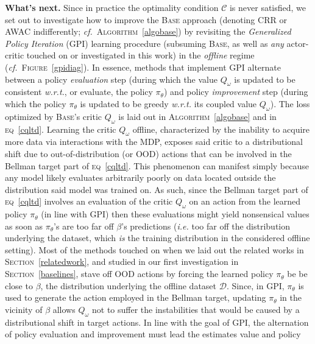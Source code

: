 \textbf{What's next.}
Since in practice the optimality condition $\mathcal{C}$ is never satisfied,
we set out to investigate how to improve the \textsc{Base} approach (denoting CRR
or AWAC indifferently;
\textit{cf.}~\textsc{Algorithm}~\ref{algobase})
by revisiting the
\emph{Generalized Policy Iteration} (GPI) learning procedure
(subsuming \textsc{Base}, as well as \emph{any} actor-critic touched on or investigated in this work)
in the \emph{offline} regime
(\textit{cf.}~\textsc{Figure}~\ref{gpidiag}).
In essence, methods that implement GPI alternate between a policy \emph{evaluation} step
(during which the value $Q_\omega$ is updated to be consistent \textit{w.r.t.}, or evaluate, the policy $\pi_\theta$)
and policy \emph{improvement} step
(during which the policy $\pi_\theta$ is updated to be greedy \textit{w.r.t.} its coupled value $Q_\omega$).
The loss optimized by \textsc{Base}'s critic $Q_\omega$ is laid out in \textsc{Algorithm}~\ref{algobase}
and in \textsc{eq}~\ref{cqltd}.
Learning the critic $Q_\omega$ offline,
characterized by the inability to acquire more data via interactions with the MDP,
exposes said critic to a distributional shift due to
out-of-distribution (or OOD) actions that can be involved in the Bellman target part of \textsc{eq}~\ref{cqltd}.
This phenomenon can manifest simply because any model likely evaluates arbitrarily poorly on
data located outside the distribution said model was trained on.
As such, since the Bellman target part of \textsc{eq}~\ref{cqltd}
involves an evaluation of the critic $Q_\omega$ on an action from the learned policy $\pi_\theta$ (in line with GPI)
then these evaluations might yield nonsensical values as soon as $\pi_\theta$'s are too far off
$\beta$'s predictions (\textit{i.e.} too far off the distribution underlying the dataset,
which \emph{is} the training distribution in the considered offline setting).
Most of the methods touched on when we laid out the related works in \textsc{Section}~\ref{relatedwork},
and studied in our first investigation in \textsc{Section}~\ref{baselines},
stave off OOD actions by forcing the learned policy $\pi_\theta$ be be close to $\beta$,
the distribution underlying the offline dataset $\mathcal{D}$.
Since, in GPI, $\pi_\theta$ is used to generate the action employed in the Bellman target,
updating $\pi_\theta$ in the vicinity of $\beta$ allows $Q_\omega$ not to suffer the instabilities
that would be caused by a distributional shift in target actions.
In line with the goal of GPI,
the alternation of policy evaluation and improvement must lead the estimates value and policy
